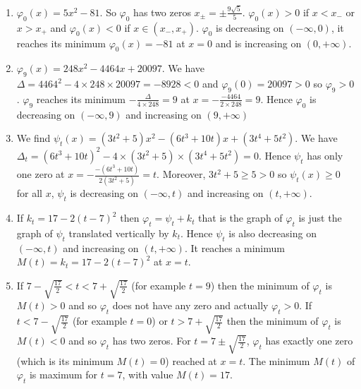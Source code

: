  \begin{enumerate}
\item $\varphi_0(x) = 5x^2 - 81$. So $\varphi_0$ has two zeros
  $x_\pm = \pm \frac{9 \sqrt{5}}{5}$. $\varphi_0(x) > 0$ if $x < x_-$ or
  $x > x_+$ and $\varphi_0(x) < 0$ if $x \in (x_-,x_+)$. $\varphi_0$ is
  decreasing on $(-\infty,0)$, it reaches its minimum $\varphi_0(x) = -81$
  at $x = 0$ and is increasing on $(0, +\infty)$.
\item $\varphi_9(x) = 248x^2-4464x+20097$. We have
  $\Delta = 4464^2 - 4 \times 248 \times 20097 = -8928 < 0$ and
  $\varphi_9(0) = 20097 > 0$ so $\varphi_9 > 0$. $\varphi_9$ reaches
  its minimum $-\frac{\Delta}{4 \times 248} = 9$ at
  $x = -\frac{-4464}{2 \times 248} = 9$. Hence
  $\varphi_0$ is decreasing on $(-\infty,9)$ and increasing on
  $(9, +\infty)$
\item We find
  $\psi_t(x) = {(3t^2+5)}x^2-{(6t^3+10t)}x + {(3t^4+5t^2)}$.
  We have $\Delta_t ={(6t^3+10t)}^2 - 4 \times {(3t^2+5)} \times {(3t^4+5t^2)}
  = 0$. Hence $\psi_t$ has only one zero at
  $x = -\frac{-{(6t^3+10t)}}{2{(3t^2+5)}} = t$.
  Moreover, $3t^2+5 \geq 5 > 0$ so $\psi_t(x) \geq 0$ for all $x$,
  $\psi_t$ is decreasing on $(-\infty,t)$ and increasing
  on $(t,+\infty)$.

\item If $k_t = 17 - 2(t-7)^2$ then
  $\varphi_t =  \psi_t + k_t$ that is the graph of $\varphi_t$ is just
  the graph of $\psi_t$ translated vertically by $k_t$.
  Hence $\psi_t$ is also decreasing on $(-\infty,t)$ and increasing
  on $(t,+\infty)$. It reaches a minimum
  $M(t) = k_t = 17 - 2(t-7)^2$ at $x = t$.

\item If $7 - \sqrt{\frac{17}{2}} < t < 7 + \sqrt{\frac{17}{2}}$
  (for example $t = 9$) then
  the minimum of $\varphi_t$ is $M(t) > 0$ and so $\varphi_t$ does not have
  any zero and actually $\varphi_t > 0$.
  If $t < 7 - \sqrt{\frac{17}{2}}$ (for example $t = 0$) or
  $t > 7 + \sqrt{\frac{17}{2}}$ then the minimum of $\varphi_t$ is $M(t) < 0$
  and so $\varphi_t$ has two zeros.
  For $t = 7 \pm \sqrt{\frac{17}{2}}$, $\varphi_t$ has exactly one zero
  (which is its minimum $M(t) = 0$) reached at $x = t$.
  The minimum $M(t)$ of $\varphi_t$ is maximum for
  $t = 7$, with value $M(t) = 17$.
\end{enumerate}
